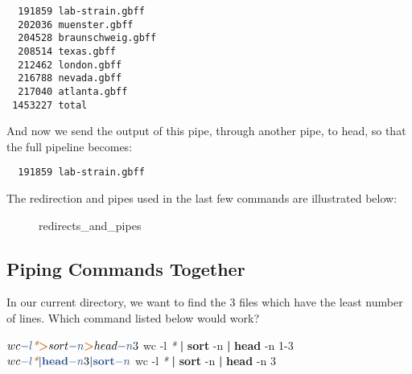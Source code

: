 \documentclass[
]{book}
\makeatletter
\newenvironment{Shaded}{\begin{snugshade}}{\end{snugshade}}
\newcommand{\AttributeTok}[1]{\textcolor[rgb]{0.13,0.29,0.53}{#1}}
\newcommand{\ExtensionTok}[1]{#1}
\newcommand{\FunctionTok}[1]{\textcolor[rgb]{0.13,0.29,0.53}{\textbf{#1}}}
\newcommand{\KeywordTok}[1]{\textcolor[rgb]{0.13,0.29,0.53}{\textbf{#1}}}
\newcommand{\NormalTok}[1]{#1}
\newcommand{\OperatorTok}[1]{\textcolor[rgb]{0.81,0.36,0.00}{\textbf{#1}}}
\newcommand{\PreprocessorTok}[1]{\textcolor[rgb]{0.56,0.35,0.01}{\textit{#1}}}
\newcommand*\pandocbounded[1]{%
  \sbox\pandoc@box{#1}%
  \Gscale@div\@tempa{\textheight}{\dimexpr\ht\pandoc@box+\dp\pandoc@box\relax}%
  \Gscale@div\@tempb{\linewidth}{\wd\pandoc@box}%
  \ifdim\@tempb\p@<\@tempa\p@\let\@tempa\@tempb\fi%
  \ifdim\@tempa\p@<\p@\scalebox{\@tempa}{\usebox\pandoc@box}%
  \else\usebox{\pandoc@box}%
  \fi%
}
\makeatother
\begin{document}
\begin{verbatim}
  191859 lab-strain.gbff
  202036 muenster.gbff
  204528 braunschweig.gbff
  208514 texas.gbff
  212462 london.gbff
  216788 nevada.gbff
  217040 atlanta.gbff
 1453227 total
\end{verbatim}

And now we send the output of this pipe, through another pipe, to head, so that the full pipeline becomes:

\begin{Shaded}
\end{Shaded}

\begin{verbatim}
  191859 lab-strain.gbff
\end{verbatim}

The redirection and pipes used in the last few commands are illustrated below:

\begin{figure}
\centering
\pandocbounded{}
\caption{redirects\_and\_pipes}
\end{figure}

\subsection{Piping Commands Together}\label{piping-commands-together}

In our current directory, we want to find the 3 files which have the least number of lines. Which command listed below would work?

\begin{Shaded}
\begin{Highlighting}[]
\ExtensionTok{$}\NormalTok{ wc }\AttributeTok{{-}l} \PreprocessorTok{*} \OperatorTok{\textgreater{}}\NormalTok{ sort }\AttributeTok{{-}n} \OperatorTok{\textgreater{}}\NormalTok{ head }\AttributeTok{{-}n}\NormalTok{ 3}
\ExtensionTok{$}\NormalTok{ wc }\AttributeTok{{-}l} \PreprocessorTok{*} \KeywordTok{|} \FunctionTok{sort} \AttributeTok{{-}n} \KeywordTok{|} \FunctionTok{head} \AttributeTok{{-}n}\NormalTok{ 1{-}3}
\ExtensionTok{$}\NormalTok{ wc }\AttributeTok{{-}l} \PreprocessorTok{*} \KeywordTok{|} \FunctionTok{head} \AttributeTok{{-}n}\NormalTok{ 3 }\KeywordTok{|} \FunctionTok{sort} \AttributeTok{{-}n}
\ExtensionTok{$}\NormalTok{ wc }\AttributeTok{{-}l} \PreprocessorTok{*} \KeywordTok{|} \FunctionTok{sort} \AttributeTok{{-}n} \KeywordTok{|} \FunctionTok{head} \AttributeTok{{-}n}\NormalTok{ 3}
\end{Highlighting}
\end{Shaded}
\end{document}
